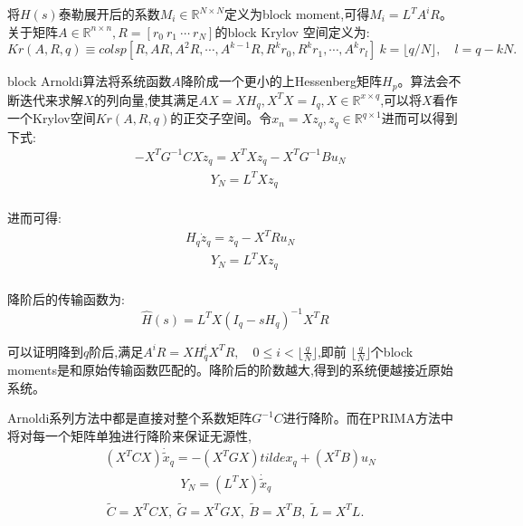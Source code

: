 \documentclass[12pt]{article}
\begin{document}
\begin{sloppypar}
\qquad 将$H(s)$泰勒展开后的系数$M_i \in \mathbb{R}^{N \times N}$定义为block moment,可得$M_i = L^T A^i R$。 关于矩阵$A \in \mathbb{R}^{n \times n}, R = [r_0\ r_1\ \cdots \ r_N]$的block Krylov 空间定义为:
\begin{equation}
  Kr(A, R, q) \equiv colsp \left[R, A R, A^2 R, \cdots,A^{k-1} R, R^k r_0, R^k r_1, \cdots, A^k r_l\right] \ k=\lfloor q / N\rfloor, \quad l=q-k N .
\end{equation}

\qquad block Arnoldi算法将系统函数$A$降阶成一个更小的上Hessenberg矩阵$H_p$。算法会不断迭代来求解$X$的列向量,使其满足$AX=XH_q,X^TX=I_q,X \in \mathbb{R}^{x \times q}$,可以将$X$看作一个Krylov空间$Kr(A,R,q)$的正交子空间。令$x_n = Xz_q, z_q \in \mathbb{R}^{q \times 1}$进而可以得到下式:
\begin{equation}
  \begin{aligned}
    & -X^T G^{-1} C X \dot{z}_q = X^T X z_q-X^T G^{-1} B u_N \\
    & \qquad \qquad \qquad Y_N =L^T X z_q \\
  \end{aligned}
\end{equation}

\qquad 进而可得:
\begin{equation}
  \begin{align}
    & H_q \dot{z}_q =z_q-X^T R u_N \\
    & \qquad Y_N =L^T X z_q \\    
  \end{align}
\end{equation}

\qquad 降阶后的传输函数为:
\begin{equation}
  \hat{H}(s)=L^T X\left(I_q-s H_q\right)^{-1} X^T R
\end{equation}

\qquad 可以证明降到$q$阶后,满足$A^i R=X H_q^i X^T R, \quad 0 \leq i< \lfloor\frac{q}{N} \rfloor$,即前
$\lfloor \frac{q}{N} \rfloor$个block moments是和原始传输函数匹配的。降阶后的阶数越大,得到的系统便越接近原始系统。

\qquad Arnoldi系列方法中都是直接对整个系数矩阵$G^{-1}C$进行降阶。而在PRIMA方法中将对每一个矩阵单独进行降阶来保证无源性,
\begin{equation}
  \begin{align}
    & \left(X^T C X\right) \dot{\tilde{x}}_q =-\left(X^T G X\right) tilde{x}_q+\left(X^T B\right) u_N \\
    &\qquad \qquad \qquad Y_N =\left(L^T X\right) \dot{\tilde{x}}_q \\
  \end{align}
\end{equation}
\begin{equation}
  \tilde{C}=X^T C X,\  \tilde{G}=X^T G X, \ \tilde{B}=X^T B, \ \tilde{L}=X^T L .
\end{equation}


\end{sloppypar}
\end{document}
